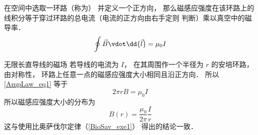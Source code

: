 
在空间中选取一环路（称为） 并定义一个正方向， 那么磁感应强度在该环路上的线积分等于穿过环路的总电流（电流的正方向由右手定则 判断）乘以真空中的磁导率．
\begin{equation}\label{AmpLaw_eq1}
\oint \vec B \vdot \dd{\vec l} = \mu_0 I
\end{equation}

\begin{exam}{无限长直导线的磁场}
若导线的电流为 $I$， 在其周围作一个半径为 $r$ 的安培环路， 由对称性， 环路上任意一点的磁感应强度大小相同且沿正方向． 所以\autoref{AmpLaw_eq1} 等于
\begin{equation}
2\pi r B = \mu_0 I
\end{equation}
所以磁感应强度大小的分布为
\begin{equation}
B(r) = \frac{\mu_0}{2\pi} \frac Ir
\end{equation}
这与使用比奥萨伐尔定律（\autoref{BioSav_exe1}） 得出的结论一致．
\end{exam}